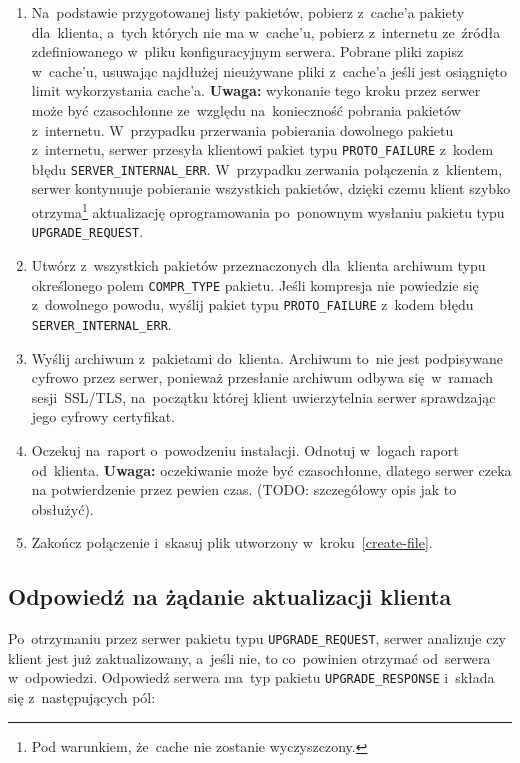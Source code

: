 \documentclass[thesis]{subfiles}
\begin{document}
\begin{enumerate}
	\item Na~podstawie przygotowanej listy pakietów, pobierz z~cache'a pakiety dla~klienta, a~tych których nie ma w~cache'u, pobierz z~internetu ze~źródła zdefiniowanego w~pliku konfiguracyjnym serwera. Pobrane pliki zapisz w~cache'u, usuwając najdłużej nieużywane pliki z~cache'a jeśli jest osiągnięto limit wykorzystania cache'a. \textbf{Uwaga:} wykonanie tego kroku przez serwer może być czasochłonne ze~względu na~konieczność pobrania pakietów z~internetu. W~przypadku przerwania pobierania dowolnego pakietu z~internetu, serwer przesyła klientowi pakiet typu \texttt{PROTO\_FAILURE} z~kodem błędu \texttt{SERVER\_INTERNAL\_ERR}. W~przypadku zerwania połączenia z~klientem, serwer kontynuuje pobieranie wszystkich pakietów, dzięki czemu klient szybko otrzyma\footnote{Pod warunkiem, że~cache nie zostanie wyczyszczony.} aktualizację oprogramowania po~ponownym wysłaniu pakietu typu \texttt{UPGRADE\_REQUEST}.
	\item Utwórz z~wszystkich pakietów przeznaczonych dla~klienta archiwum typu określonego polem \texttt{COMPR\_TYPE} pakietu. Jeśli kompresja nie powiedzie się z~dowolnego powodu, wyślij pakiet typu \texttt{PROTO\_FAILURE} z~kodem błędu \texttt{SERVER\_INTERNAL\_ERR}.
	\item Wyślij archiwum z~pakietami do~klienta. Archiwum to~nie jest podpisywane cyfrowo przez serwer, ponieważ przesłanie archiwum odbywa się~w~ramach sesji~SSL/TLS, na~początku której klient uwierzytelnia serwer sprawdzając jego cyfrowy certyfikat.
	\item Oczekuj na~raport o~powodzeniu instalacji. Odnotuj w~logach raport od~klienta. \textbf{Uwaga:} oczekiwanie może być czasochłonne, dlatego serwer czeka na potwierdzenie przez pewien czas. (TODO: szczegółowy opis jak to obsłużyć).
	\item Zakończ połączenie i~skasuj plik utworzony w~kroku~\ref{create-file}.
\end{enumerate}


\subsection{Odpowiedź na żądanie aktualizacji klienta}
\label{full-upgrade-response}

Po~otrzymaniu przez serwer pakietu typu \texttt{UPGRADE\_REQUEST}, serwer analizuje czy klient jest już zaktualizowany, a~jeśli nie, to co~powinien otrzymać od~serwera w~odpowiedzi. Odpowiedź serwera ma~typ pakietu \texttt{UPGRADE\_RESPONSE} i~składa się z~następujących pól:
\end{document}
